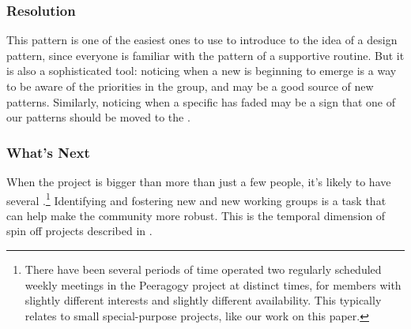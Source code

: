 \subsubsection*{Resolution} This pattern is one of the easiest ones to use to introduce  to the idea of a design pattern, since everyone is familiar with the pattern of a supportive routine.  But it is also a sophisticated tool: noticing when a new  is beginning to emerge is a way to be aware of the priorities in the group, and may be a good source of new patterns.  Similarly, noticing when a specific  has faded may be a sign that one of our patterns should be moved to the .

\subsubsection*{What's Next} When the project is bigger than more than just a few people, it's likely to have several .\footnote{There have been several periods of time operated two regularly scheduled weekly meetings in the Peeragogy project at distinct times, for members with slightly different interests and slightly different availability.  This typically relates to small special-purpose projects, like our work on this paper.}  Identifying and fostering new  and new working groups is a task that can help make the community more robust.  This is the temporal dimension of spin off projects described in .
